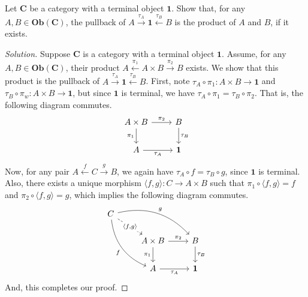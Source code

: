 \documentclass[]{amsbook}
\newcommand{\catname}[1]{\mathbf{#1}}
\newcommand{\0}{\mathbf{0}}
\newcommand{\1}{\mathbf{1}}
\newenvironment{solution}
    {\begin{proof}[Solution]}{\end{proof}}
\begin{document}
\setcounter{Exercise}{36}
\begin{Exercise}
    Let $\catname{C}$ be a category with a terminal object $\1$. Show that, for
    any $A, B \in \mathbf{Ob}(\catname{C})$, the pullback of $A
    \xrightarrow{\tau_A} \1 \xleftarrow{\tau_B} B$ is the product of $A$ and $B$,
    if it exists.
\end{Exercise}
\begin{solution}
    Suppose $\catname{C}$ is a category with a terminal object $\1$. Assume, for
    any $A, B \in \mathbf{Ob}(\catname{C})$, their product $A \xleftarrow{\pi_1}
    A \times B \xrightarrow{\pi_2} B$ exists. We show that this product is the
    pullback of $A \xrightarrow{\tau_A} \1 \xleftarrow{\tau_B} B$. First, note
    $\tau_A \circ \pi_1 : A \times B \to \1$ and $\tau_B \circ \pi_w : A \times
    B \to \1$, but since $\1$ is terminal, we have $\tau_A \circ \pi_1 = \tau_B
    \circ \pi_2$. That is, the following diagram commutes.
    \[
    \begin{tikzcd}
        A \times B
        \arrow[r, "\pi_2"]
        \arrow[d, swap, "\pi_1"] &
        B
        \arrow[d, "\tau_B"] \\
        A
        \arrow[r, swap, "\tau_A"] &
        \1
    \end{tikzcd}
    \]
    Now, for any pair $A \xleftarrow{f} C \xrightarrow{g} B$, we again have
    $\tau_A \circ f = \tau_B \circ g$, since $\1$ is terminal. Also, there
    exists a unique morphism $\langle f, g \rangle : C \to A \times B$ such
    that $\pi_1 \circ \langle f, g \rangle = f$ and  $\pi_2 \circ \langle f, g
    \rangle = g$, which implies the following diagram commutes.
    \[
    \begin{tikzcd}
        C
        \arrow[ddr, swap, bend right, "f"]
        \arrow[drr, bend left, "g"]
        \arrow[dr, dashed, "{\langle f, g \rangle}" description] & & \\
        & A \times B
        \arrow[r, "\pi_2"]
        \arrow[d, swap, "\pi_1"] &
        B
        \arrow[d, "\tau_B"] \\
        & A
        \arrow[r, swap, "\tau_A"] &
        \1
    \end{tikzcd}
    \]
    And, this completes our proof.
\end{solution}
\end{document}
